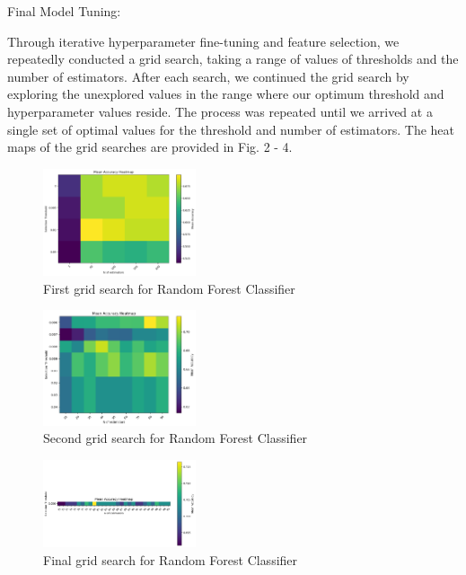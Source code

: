 \documentclass[journal,comsoc]{IEEEtran}
\begin{document}
Final Model Tuning:

Through iterative hyperparameter fine-tuning and feature selection, we repeatedly conducted a grid search, taking a range of values of thresholds and the number of estimators. After each search, we continued the grid search by exploring the unexplored values in the range where our optimum threshold and hyperparameter values reside. The process was repeated until we arrived at a single set of optimal values for the threshold and number of estimators. The heat maps of the grid searches are provided in Fig. 2 - 4.

\begin{figure}[H]
  \centering
  \includegraphics[width=0.4\textwidth]{rf_grid_search_1.png}
  \caption{First grid search for Random Forest Classifier}
  \label{fig:rf_grid_search_1}
\end{figure}

\begin{figure}[H]
  \centering
  \includegraphics[width=0.4\textwidth]{rf_grid_search_2.png}
  \caption{Second grid search for Random Forest Classifier}
  \label{fig:rf_grid_search_2}
\end{figure}

\begin{figure}[H]
  \centering
  \includegraphics[width=0.4\textwidth]{rf_grid_search_3.png}
  \caption{Final grid search for Random Forest Classifier}
  \label{fig:rf_grid_search_3}
\end{figure}
\end{document}
